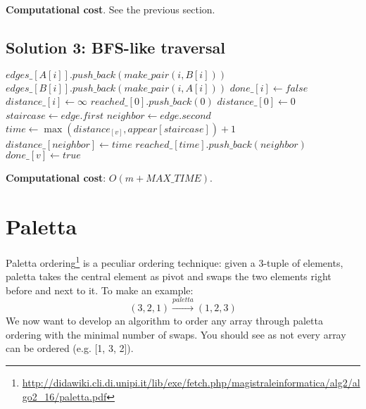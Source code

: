 \documentclass{article}
\begin{document}
\begin{framed}
  \noindent
  \textbf{Computational cost}. See the previous section.
\end{framed}

\subsection{Solution 3: BFS-like traversal}

\begin{algorithmic}[1]
          \State $edges\_[A[i]].push\_back(make\_pair(i, B[i]))$
          \State $edges\_[B[i]].push\_back(make\_pair(i, A[i]))$
      \EndFor
          \State $done\_[i] \gets false$
          \State $distance\_[i] \gets \infty$
      \EndFor
      \State $reached\_[0].push\_back(0)$
    \State $distance\_[0] \gets 0$
            \State $staircase \gets edge.first$
            \State $neighbor \gets edge.second$
            \State $time \gets \max(distance_[v], appear[staircase])+1$
              \State $distance\_[neighbor] \gets time$
              \State $reached\_[time].push\_back(neighbor)$
            \EndIf
          \EndFor
        \State $done\_[v] \gets true$
          \EndIf
      \EndFor
    \EndFor
    \State {}
  \EndFunction
\end{algorithmic}

\begin{framed}
  \noindent
  \textbf{Computational cost}: $O(m + MAX\_TIME)$.
\end{framed}


\section{Paletta}

Paletta ordering\footnote{\url{http://didawiki.cli.di.unipi.it/lib/exe/fetch.php/magistraleinformatica/alg2/algo2_16/paletta.pdf}}
is a peculiar ordering technique: given a 3-tuple of elements, paletta takes the
central element as pivot and swaps the two elements right before and next to it.
To make an example:
$$(3, 2, 1) \xrightarrow{paletta} (1, 2, 3)$$
We now want to develop an algorithm to order any array through paletta ordering
with the minimal number of swaps.
You should see as not every array can be ordered (e.g. [1, 3, 2]).
\end{document}
